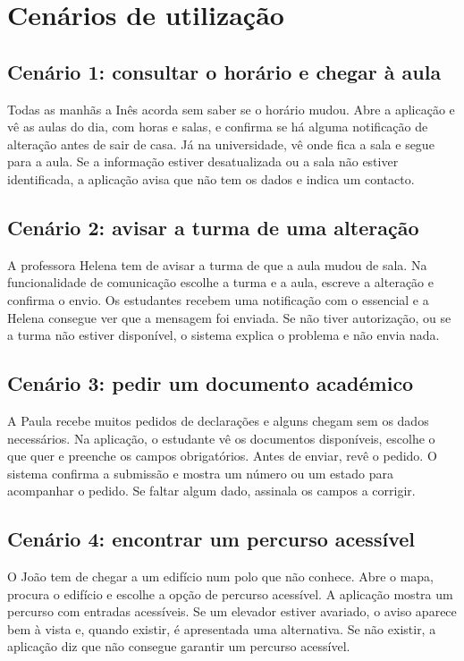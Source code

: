 \documentclass[11pt,a4paper]{article}
\begin{document}
\section{Cenários de utilização}

\subsection{Cenário 1: consultar o horário e chegar à aula}

Todas as manhãs a Inês acorda sem saber se o horário mudou. Abre a aplicação e vê as aulas do dia, com horas e salas, e confirma se há alguma notificação de alteração antes de sair de casa. Já na universidade, vê onde fica a sala e segue para a aula. Se a informação estiver desatualizada ou a sala não estiver identificada, a aplicação avisa que não tem os dados e indica um contacto.

\subsection{Cenário 2: avisar a turma de uma alteração}

A professora Helena tem de avisar a turma de que a aula mudou de sala. Na funcionalidade de comunicação escolhe a turma e a aula, escreve a alteração e confirma o envio. Os estudantes recebem uma notificação com o essencial e a Helena consegue ver que a mensagem foi enviada. Se não tiver autorização, ou se a turma não estiver disponível, o sistema explica o problema e não envia nada.

\subsection{Cenário 3: pedir um documento académico}

A Paula recebe muitos pedidos de declarações e alguns chegam sem os dados necessários. Na aplicação, o estudante vê os documentos disponíveis, escolhe o que quer e preenche os campos obrigatórios. Antes de enviar, revê o pedido. O sistema confirma a submissão e mostra um número ou um estado para acompanhar o pedido. Se faltar algum dado, assinala os campos a corrigir.

\subsection{Cenário 4: encontrar um percurso acessível}

O João tem de chegar a um edifício num polo que não conhece. Abre o mapa, procura o edifício e escolhe a opção de percurso acessível. A aplicação mostra um percurso com entradas acessíveis. Se um elevador estiver avariado, o aviso aparece bem à vista e, quando existir, é apresentada uma alternativa. Se não existir, a aplicação diz que não consegue garantir um percurso acessível.
\end{document}
